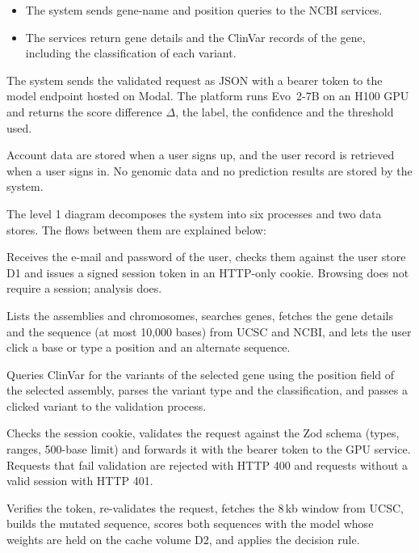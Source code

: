 \begin{itemize}
\item The system sends gene-name and position queries to the NCBI services.
\item The services return gene details and the ClinVar records of the gene, including the classification of each variant.
\end{itemize}

The system sends the validated request as JSON with a bearer token to the model endpoint hosted on Modal. The platform runs Evo~2-7B on an H100 GPU and returns the score difference $\Delta$, the label, the confidence and the threshold used.

Account data are stored when a user signs up, and the user record is retrieved when a user signs in. No genomic data and no prediction results are stored by the system.

The level 1 diagram decomposes the system into six processes and two data stores. The flows between them are explained below:

Receives the e-mail and password of the user, checks them against the user store D1 and issues a signed session token in an HTTP-only cookie. Browsing does not require a session; analysis does.

Lists the assemblies and chromosomes, searches genes, fetches the gene details and the sequence (at most 10,000 bases) from UCSC and NCBI, and lets the user click a base or type a position and an alternate sequence.

Queries ClinVar for the variants of the selected gene using the position field of the selected assembly, parses the variant type and the classification, and passes a clicked variant to the validation process.

Checks the session cookie, validates the request against the Zod schema (types, ranges, 500-base limit) and forwards it with the bearer token to the GPU service. Requests that fail validation are rejected with HTTP 400 and requests without a valid session with HTTP 401.

Verifies the token, re-validates the request, fetches the 8\,kb window from UCSC, builds the mutated sequence, scores both sequences with the model whose weights are held on the cache volume D2, and applies the decision rule.

